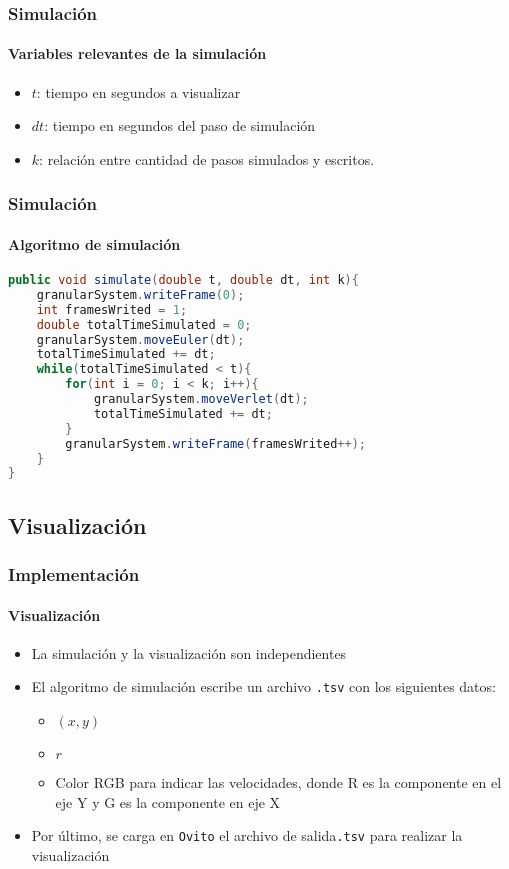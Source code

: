 \documentclass[hyperref={pdfpagelayout=SinglePage}]{beamer}
\begin{document}
\begin{frame}
\frametitle{Simulación}
\framesubtitle{Variables relevantes de la simulación}
\begin{itemize}
	\item $t$: tiempo en segundos a visualizar
	\item $dt$: tiempo en segundos del paso de simulación
	\item $k$: relación entre cantidad de pasos simulados y escritos.
\end{itemize}
\end{frame}

\begin{frame}[fragile]
\frametitle{Simulación}
\framesubtitle{Algoritmo de simulación}
\begin{lstlisting}[language=Java, caption = Algoritmo de simulación]
public void simulate(double t, double dt, int k){
	granularSystem.writeFrame(0);
    int framesWrited = 1;
    double totalTimeSimulated = 0;
    granularSystem.moveEuler(dt);
    totalTimeSimulated += dt;
    while(totalTimeSimulated < t){
		for(int i = 0; i < k; i++){
			granularSystem.moveVerlet(dt);
        	totalTimeSimulated += dt;
    	}
    	granularSystem.writeFrame(framesWrited++);
    }
}
\end{lstlisting}
\end{frame}

\subsection{Visualización}

\begin{frame}
\frametitle{Implementación}
\framesubtitle{Visualización}
\begin{itemize}
	\item La simulación y la visualización son independientes
	\item El algoritmo de simulación escribe un archivo \texttt{.tsv} con los siguientes datos:
	\begin{itemize}
		\item $(x,y)$
		\item $r$
		\item Color RGB para indicar las velocidades, donde R es la componente en el eje Y y G es la componente en eje X
	\end{itemize}
	\item Por último, se carga en \texttt{Ovito} el archivo de salida\texttt{.tsv} para realizar la visualización
\end{itemize}
\end{frame}
\end{document}
